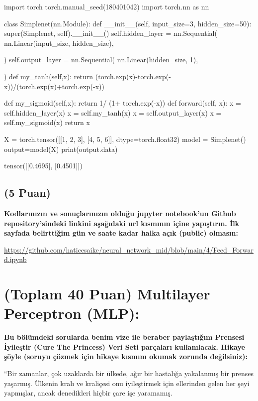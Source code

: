 \documentclass[11pt]{article}
\begin{document}
\begin{python}
import torch
torch.manual_seed(180401042)
import torch.nn as nn

class Simplenet(nn.Module):
    def __init__(self, input_size=3, hidden_size=50):
        super(Simplenet, self).__init__()
        self.hidden_layer = nn.Sequential(
            nn.Linear(input_size, hidden_size),
            
        )
        self.output_layer = nn.Sequential(
            nn.Linear(hidden_size, 1),
            
        )
    def my_tanh(self,x):
      return (torch.exp(x)-torch.exp(-x))/(torch.exp(x)+torch.exp(-x))

    def my_sigmoid(self,x):
      return 1/ (1+ torch.exp(-x))    
    def forward(self, x):
        x = self.hidden_layer(x)
        x = self.my_tanh(x)
        x = self.output_layer(x)
        x = self.my_sigmoid(x)
        return x

X = torch.tensor([[1, 2, 3], [4, 5, 6]], dtype=torch.float32)
model = Simplenet()
output=model(X)
print(output.data)
\end{python}

tensor([[0.4695],
        [0.4501]])

\subsection{(5 Puan)} \textbf{Kodlarınızın ve sonuçlarınızın olduğu jupyter notebook'un Github repository'sindeki linkini aşağıdaki url kısmının içine yapıştırın. İlk sayfada belirttiğim gün ve saate kadar halka açık (public) olmasın:}

\url{https://github.com/haticesaike/neural_network_mid/blob/main/4/Feed_Forward.ipynb}

\section{(Toplam 40 Puan) Multilayer Perceptron (MLP):} 
\textbf{Bu bölümdeki sorularda benim vize ile beraber paylaştığım Prensesi İyileştir (Cure The Princess) Veri Seti parçaları kullanılacak. Hikaye şöyle (soruyu çözmek için hikaye kısmını okumak zorunda değilsiniz):} 

``Bir zamanlar, çok uzaklarda bir ülkede, ağır bir hastalığa yakalanmış bir prenses yaşarmış. Ülkenin kralı ve kraliçesi onu iyileştirmek için ellerinden gelen her şeyi yapmışlar, ancak denedikleri hiçbir çare işe yaramamış.
\end{document}
